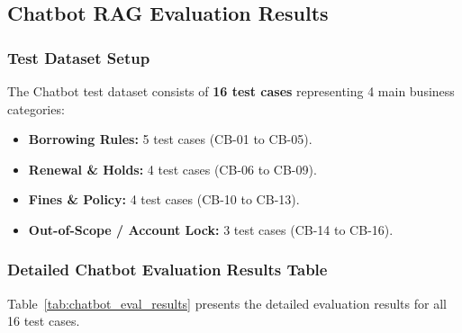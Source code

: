 \subsection{Chatbot RAG Evaluation Results}

\subsubsection{Test Dataset Setup}

The Chatbot test dataset consists of \textbf{16 test cases} representing 4 main business categories:
\begin{itemize}
    \item \textbf{Borrowing Rules:} 5 test cases (CB-01 to CB-05).
    \item \textbf{Renewal \& Holds:} 4 test cases (CB-06 to CB-09).
    \item \textbf{Fines \& Policy:} 4 test cases (CB-10 to CB-13).
    \item \textbf{Out-of-Scope / Account Lock:} 3 test cases (CB-14 to CB-16).
\end{itemize}

\subsubsection{Detailed Chatbot Evaluation Results Table}

Table~\ref{tab:chatbot_eval_results} presents the detailed evaluation results for all 16 test cases.

